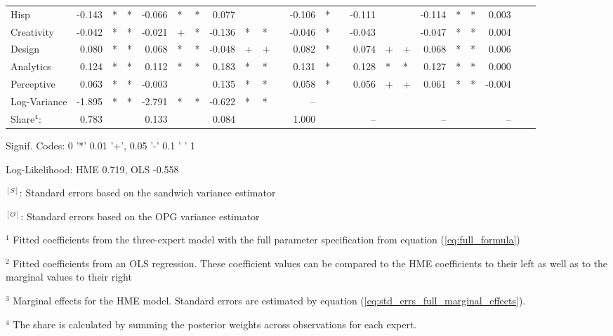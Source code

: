 \documentclass[12pt]{article}
\theoremstyle{definition}
\begin{document}
\begin{landscape}
\begin{table}
\begin{threeparttable}
\begin{tabular}[l]{l r l l r l l r l l c r l c r l l r l l r l l}
    Hisp                  & -0.143 & * & *   & -0.066 & * & *   &  0.077 &   &     && -0.106 & *     && -0.111 &   &       & -0.114 & * & *     &  0.003 &  \\
    Creativity            & -0.042 & * & *   & -0.021 & + & *   & -0.136 & * & *   && -0.046 & *     && -0.043 &   &       & -0.047 & * & *     &  0.004 &  \\
    Design                &  0.080 & * & *   &  0.068 & * & *   & -0.048 & + & +   &&  0.082 & *     &&  0.074 & + & +     &  0.068 & * & *     &  0.006 &  \\
    Analytics             &  0.124 & * & *   &  0.112 & * & *   &  0.183 & * & *   &&  0.131 & *     &&  0.128 & * & *     &  0.127 & * & *     &  0.000 &  \\
    Perceptive            &  0.063 & * & *   & -0.003 &   &     &  0.135 & * & *   &&  0.058 & *     &&  0.056 & + & +     &  0.061 & * & *     & -0.004 &  \\
    Log-Variance          & -1.895 & * & *   & -2.791 & * & *   & -0.622 & * & *   &&  --    &       &&        &   &       &        &   &       &        &  \\
    \cmidrule(l){2-4} \cmidrule(l){5-7} \cmidrule(l){8-10} \cmidrule(l){12-13} \cmidrule(l){15-17} \cmidrule(l){18-20} \cmidrule(l){21-23}
    Share$^{4}$:          & 0.783  &   &     & 0.133  &   &     & 0.084  &   &     &&  1.000 &       &&  --    &   &       &  --    &   &       &  --    &  \\
    \cmidrule{1-17}
          \end{tabular}
    
          \begin{tablenotes}
            \item Signif. Codes: 0 '*' 0.01 '+', 0.05 '-' 0.1 ' ' 1
            \item Log-Likelihood: HME 0.719, OLS -0.558
            \item $^{[S]}$: Standard errors based on the sandwich variance estimator
            \item $^{[O]}$: Standard errors based on the OPG variance estimator
            \item $^{1}$ Fitted coefficients from the three-expert model with the full parameter specification from equation (\ref{eq:full_formula})
            \item $^{2}$ Fitted coefficients from an OLS regression. These coefficient values can be compared to the HME coefficients to their left as well as to the marginal values to their right
            \item $^{3}$ Marginal effects for the HME model. Standard errors are estimated by equation (\ref{eq:std_errs_full_marginal_effects}).
            \item $^{4}$ The share is calculated by summing the posterior weights across observations for each expert.
    

\end{tablenotes}
\end{threeparttable}
\end{table}
\end{landscape}
\end{document}
